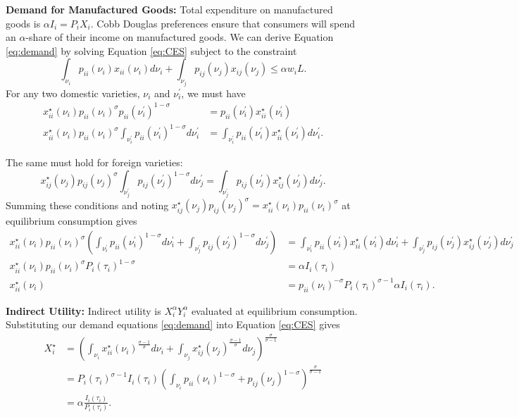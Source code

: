 \documentclass{puthesis}
\begin{document}
\textbf{Demand for Manufactured Goods:} Total expenditure on
manufactured goods is \(\alpha I_i = P_i X_i\). Cobb Douglas preferences
ensure that consumers will spend an \(\alpha\)-share of their income on
manufactured goods. We can derive Equation \ref{eq:demand} by solving
Equation \ref{eq:CES} subject to the constraint
\begin{equation} \label{eq:CESconstraint}
\int_{\nu_i} p_{ii}(\nu_i) x_{ii}(\nu_i) d \nu_i + \int_{\nu_j} p_{ij}(\nu_j) x_{ij}(\nu_j) \leq \alpha w_i L .
\end{equation} For any two domestic varieties, \(\nu_i\) and
\(\nu_i^\prime\), we must have \begin{align*}
x_{ii}^\star(\nu_i) p_{ii}(\nu_i)^{\sigma} p_{ii}(\nu_i^\prime)^{1 - \sigma} &= p_{ii}(\nu_i^\prime) x_{ii}^\star(\nu_i^\prime) \\
x_{ii}^\star(\nu_i) p_{ii}(\nu_i)^{\sigma} \int_{\nu_i^\prime} p_{ii}(\nu_i^\prime)^{1 - \sigma} d \nu_i^\prime &= \int_{\nu_i^\prime} p_{ii}(\nu_i^\prime) x_{ii}^\star(\nu_i^\prime) d \nu_i^\prime .
\end{align*}

The same must hold for foreign varieties: \[
x_{ij}^\star(\nu_j) p_{ij}(\nu_j)^{\sigma} \int_{\nu_j^\prime} p_{ij}(\nu_j^\prime)^{1 - \sigma} d \nu_j^\prime = \int_{\nu_j^\prime} p_{ij}(\nu_j^\prime) x_{ij}^\star(\nu_j^\prime) d \nu_j^\prime .
\] Summing these conditions and noting
\(x_{ij}^\star(\nu_j) p_{ij}(\nu_j)^{\sigma} = x_{ii}^\star(\nu_i) p_{ii}(\nu_i)^{\sigma}\)
at equilibrium consumption gives \begin{align*}
x_{ii}^\star(\nu_i) p_{ii}(\nu_i)^{\sigma} \left( \int_{\nu_i^\prime} p_{ii}(\nu_i^\prime)^{1 - \sigma} d \nu_i^\prime + \int_{\nu_j^\prime} p_{ij}(\nu_j^\prime)^{1 - \sigma} d \nu_j^\prime \right) &= \int_{\nu_i^\prime} p_{ii}(\nu_i^\prime) x_{ii}^\star(\nu_i^\prime) d \nu_i^\prime + \int_{\nu_j^\prime} p_{ij}(\nu_j^\prime) x_{ij}^\star(\nu_j^\prime) d \nu_j^\prime \\
x_{ii}^\star(\nu_i) p_{ii}(\nu_i)^{\sigma} P_i(\tau_i)^{1 - \sigma} &= \alpha I_i(\tau_i) \\
x_{ii}^\star(\nu_i) &= p_{ii}(\nu_i)^{-\sigma} P_i(\tau_i)^{\sigma - 1} \alpha I_i(\tau_i) .
\end{align*}

\textbf{Indirect Utility:} Indirect utility is \(X_i^\alpha Y_i^\alpha\)
evaluated at equilibrium consumption. Substituting our demand equations
\ref{eq:demand} into Equation \ref{eq:CES} gives \begin{align*}
X_i^\star &= \left( \int_{\nu_i} x_{ii}^\star(\nu_i)^{\frac{\sigma - 1}{\sigma}} d \nu_i + \int_{\nu_j} x_{ij}^\star(\nu_j)^{\frac{\sigma - 1}{\sigma}} d \nu_j \right)^{\frac{\sigma}{\sigma - 1}} \\
&= P_i(\tau_i)^{\sigma - 1} I_i(\tau_i) \left( \int_{\nu_i} p_{ii}(\nu_i)^{1 - \sigma} + p_{ij}(\nu_j)^{1 - \sigma} \right)^{\frac{\sigma}{\sigma - 1}} \\
&= \alpha \frac{I_i(\tau_i)}{P_i(\tau_i)} .
\end{align*}
\end{document}
